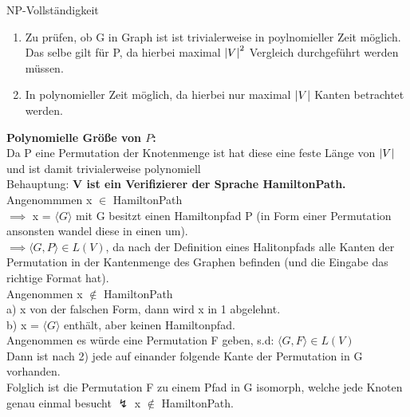 \documentclass[answers]{submit}
\begin{document}
\begin{exercise}[6]{NP-Vollständigkeit}
{    \begin{enumerate}
      \item Zu prüfen, ob G in Graph ist ist trivialerweise in poylnomieller Zeit möglich. Das selbe gilt für P, da hierbei maximal $\left\vert V \right\vert^2$ Vergleich durchgeführt werden müssen.
      \item In polynomieller Zeit möglich, da hierbei nur maximal $\left\vert V \right\vert$ Kanten betrachtet werden.
    \end{enumerate}

    \textbf{Polynomielle Größe von $P$:} \\

    Da P eine Permutation der Knotenmenge ist hat diese eine feste Länge von $\left\vert V \right\vert$ und ist damit trivialerweise polynomiell\\

    Behauptung: \textbf{V ist ein Verifizierer der Sprache HamiltonPath.} \\

    Angenommmen x $\in$ HamiltonPath \\

    $\implies$ x = $\langle G \rangle$ mit G besitzt einen Hamiltonpfad P (in Form einer Permutation ansonsten wandel diese in einen um). \\

    $\implies \langle G,P \rangle \in L(V)$, da nach der Definition eines Halitonpfads alle Kanten der Permutation in der Kantenmenge des Graphen befinden (und die Eingabe das richtige Format hat). \\

    Angenommen x $\notin$ HamiltonPath \\

    a) x von der falschen Form, dann wird x in 1 abgelehnt. \\

    b) x = $\langle G \rangle$ enthält, aber keinen Hamiltonpfad. \\

    Angenommen es würde eine Permutation F geben, s.d: $\langle G,F \rangle \in L(V)$ \\

    Dann ist nach 2) jede auf einander folgende Kante der Permutation in G vorhanden. \\

    Folglich ist die Permutation F zu einem Pfad in G isomorph, welche jede Knoten genau einmal besucht $\lightning$ x $\notin$ HamiltonPath. \\

}
\end{exercise}
\end{document}
